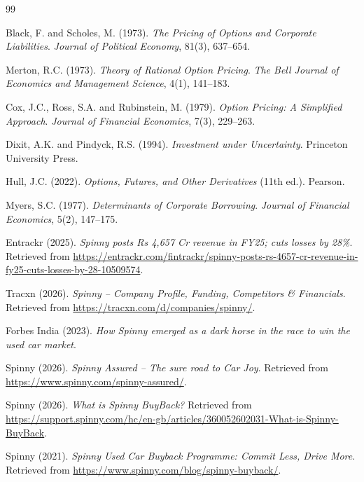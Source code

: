 \documentclass[11pt, a4paper]{article}
\begin{document}
\newpage
\begin{thebibliography}{99}

Black, F. and Scholes, M. (1973).
\textit{The Pricing of Options and Corporate Liabilities}.
\textit{Journal of Political Economy}, 81(3), 637--654.

Merton, R.C. (1973).
\textit{Theory of Rational Option Pricing}.
\textit{The Bell Journal of Economics and Management Science}, 4(1), 141--183.

Cox, J.C., Ross, S.A. and Rubinstein, M. (1979).
\textit{Option Pricing: A Simplified Approach}.
\textit{Journal of Financial Economics}, 7(3), 229--263.

Dixit, A.K. and Pindyck, R.S. (1994).
\textit{Investment under Uncertainty}.
Princeton University Press.

Hull, J.C. (2022).
\textit{Options, Futures, and Other Derivatives} (11th ed.).
Pearson.

Myers, S.C. (1977).
\textit{Determinants of Corporate Borrowing}.
\textit{Journal of Financial Economics}, 5(2), 147--175.

Entrackr (2025).
\textit{Spinny posts Rs 4,657 Cr revenue in FY25; cuts losses by 28\%}.
Retrieved from \url{https://entrackr.com/fintrackr/spinny-posts-rs-4657-cr-revenue-in-fy25-cuts-losses-by-28-10509574}.

Tracxn (2026).
\textit{Spinny -- Company Profile, Funding, Competitors \& Financials}.
Retrieved from \url{https://tracxn.com/d/companies/spinny/}.

Forbes India (2023).
\textit{How Spinny emerged as a dark horse in the race to win the used car market}.

Spinny (2026).
\textit{Spinny Assured -- The sure road to Car Joy}.
Retrieved from \url{https://www.spinny.com/spinny-assured/}.

Spinny (2026).
\textit{What is Spinny BuyBack?}
Retrieved from \url{https://support.spinny.com/hc/en-gb/articles/360052602031-What-is-Spinny-BuyBack}.

Spinny (2021).
\textit{Spinny Used Car Buyback Programme: Commit Less, Drive More}.
Retrieved from \url{https://www.spinny.com/blog/spinny-buyback/}.

\end{thebibliography}
\end{document}
